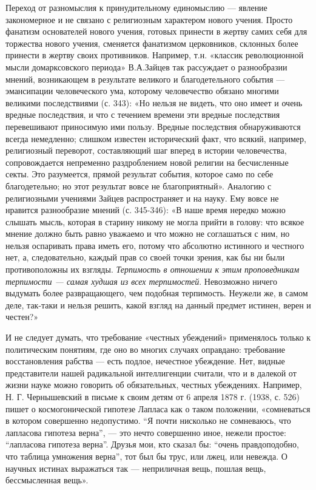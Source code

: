 Переход от разномыслия к принудительному единомыслию --- явление
закономерное и не связано с религиозным характером нового учения.
Просто фанатизм основателей нового учения, готовых принести в жертву
самих себя для торжества нового учения, сменяется фанатизмом
церковников, склонных более принести в жертву своих противников.
Например, т.н. «классик революционной мысли домарксовского периода»
В.А.Зайцев так рассуждает о разнообразии мнений, возникающем в
результате великого и благодетельного события --- эмансипации
человеческого ума, которому человечество обязано многими великими
последствиями (с. 343): «Но нельзя не видеть, что оно имеет и очень
вредные последствия, и что с течением времени эти вредные последствия
перевешивают приносимую ими пользу. Вредные последствия обнаруживаются
всегда немедленно; слишком известен исторический факт, что всякий,
например, религиозный переворот, составляющий шаг вперед в истории
человечества, сопровождается непременно раздроблением новой религии на
бесчисленные секты. Это разумеется, прямой результат события, которое
само по себе благодетельно; но этот результат вовсе не благоприятный».
Аналогию с религиозными учениями Зайцев распространяет и на науку. Ему
вовсе не нравится разнообразие мнений (с. 345-346): «В наше время
нередко можно слышать мысль, которая в старину никому не могла прийти
в голову: что всякое мнение должно быть равно уважаемо и что можно не
соглашаться с ним, но нельзя оспаривать права иметь его, потому что
абсолютно истинного и честного нет, а, следовательно, каждый прав со
своей точки зрения, как бы ни были противоположны их взгляды.
\textit{Терпимость в отношении к этим проповедникам терпимости ---
самая худшая из всех терпимостей}. Невозможно ничего выдумать более
развращающего, чем подобная терпимость. Неужели же, в самом деле,
так-таки и нельзя решить, какой взгляд на данный предмет истинен,
верен и честен?»

И не следует думать, что требование «честных убеждений» применялось
только к политическим понятиям, где оно во многих случаях оправдано:
требование восстановления рабства --- есть подлое, нечестное
убеждение. Нет, видные представители нашей радикальной интеллигенции
считали, что и в далекой от жизни науке можно говорить об
обязательных, честных убеждениях. Например, Н. Г. Чернышевский в
письме к своим детям от 6 апреля 1878 г. (1938, с. 526) пишет о
космогонической гипотезе Лапласа как о таком положении, «сомневаться в
котором совершенно недопустимо. ``Я почти нисколько не сомневаюсь, что
лапласова гипотеза верна'', --- это нечто совершенно иное, нежели
простое: ``лапласова гипотеза верна''. Друзья мои, кто сказал бы:
``очень правдоподобно, что таблица умножения верна'', тот был бы трус,
или лжец, или невежда. О научных истинах выражаться так ---
неприличная вещь, пошлая вещь, бессмысленная вещь».

